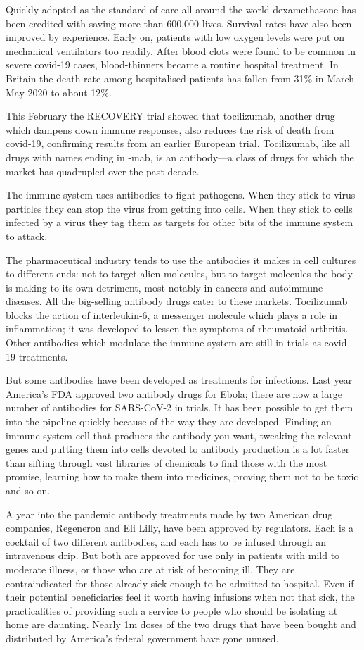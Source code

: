 \documentclass{article}
\begin{document}
Quickly adopted as the standard of care all around the world dexamethasone has been credited with saving more than 600,000 lives. Survival rates have also been improved by experience. Early on, patients with low oxygen levels were put on mechanical ventilators too readily. After blood clots were found to be common in severe covid-19 cases, blood-thinners became a routine hospital treatment. In Britain the death rate among hospitalised patients has fallen from 31\% in March-May 2020 to about 12\%. 

This February the RECOVERY trial showed that tocilizumab, another drug which dampens down immune responses, also reduces the risk of death from covid-19, confirming results from an earlier European trial. Tocilizumab, like all drugs with names ending in -mab, is an antibody---a class of drugs for which the market has quadrupled over the past decade. 

The immune system uses antibodies to fight pathogens. When they stick to virus particles they can stop the virus from getting into cells. When they stick to cells infected by a virus they tag them as targets for other bits of the immune system to attack. 

The pharmaceutical industry tends to use the antibodies it makes in cell cultures to different ends: not to target alien molecules, but to target molecules the body is making to its own detriment, most notably in cancers and autoimmune diseases. All the big-selling antibody drugs cater to these markets. Tocilizumab blocks the action of interleukin-6, a messenger molecule which plays a role in inflammation; it was developed to lessen the symptoms of rheumatoid arthritis. Other antibodies which modulate the immune system are still in trials as covid-19 treatments. 

But some antibodies have been developed as treatments for infections. Last year America's FDA approved two antibody drugs for Ebola; there are now a large number of antibodies for SARS-CoV-2 in trials. It has been possible to get them into the pipeline quickly because of the way they are developed. Finding an immune-system cell that produces the antibody you want, tweaking the relevant genes and putting them into cells devoted to antibody production is a lot faster than sifting through vast libraries of chemicals to find those with the most promise, learning how to make them into medicines, proving them not to be toxic and so on. 

A year into the pandemic antibody treatments made by two American drug companies, Regeneron and Eli Lilly, have been approved by regulators. Each is a cocktail of two different antibodies, and each has to be infused through an intravenous drip. But both are approved for use only in patients with mild to moderate illness, or those who are at risk of becoming ill. They are contraindicated for those already sick enough to be admitted to hospital. Even if their potential beneficiaries feel it worth having infusions when not that sick, the practicalities of providing such a service to people who should be isolating at home are daunting. Nearly 1m doses of the two drugs that have been bought and distributed by America's federal government have gone unused. 
\end{document}
